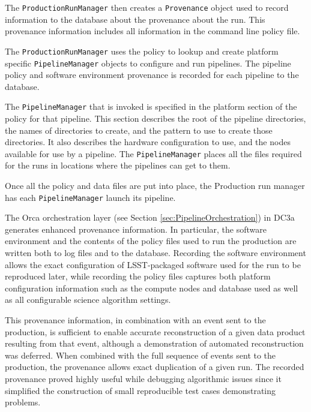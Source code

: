 The \texttt{ProductionRunManager} then creates a \texttt{Provenance} object used
to record information to the database about the provenance about the run. This
provenance information includes all information in the command line policy file.

The \texttt{ProductionRunManager} uses the policy to lookup and create platform
specific \texttt{Pipeline\-Manager} objects to configure and run pipelines. The
pipeline policy and software environment provenance is recorded for each
pipeline to the database.

The \texttt{PipelineManager} that is invoked is specified in the platform
section of the policy for that pipeline.  This section describes the root of the
pipeline directories, the names of directories to create, and the pattern to use
to create those directories.  It also describes the hardware configuration to
use, and the nodes available for use by a pipeline. The \texttt{PipelineManager}
places all the files required for the runs in locations where the pipelines can
get to them.

Once all the policy and data files are put into place, the Production run
manager has each \texttt{PipelineManager} launch its pipeline.


The Orca orchestration layer (see Section
\ref{sec:PipelineOrchestration}) in DC3a generates enhanced provenance
information.  In particular, the software environment and the contents
of the policy files used to run the production are written both to log
files and to the database.  Recording the software environment allows
the exact configuration of LSST-packaged software used for the run to be
reproduced later, while recording the policy files captures both
platform configuration information such as the compute nodes and
database used as well as all configurable science algorithm settings.

This provenance information, in combination with an event sent to the
production, is sufficient to enable accurate reconstruction of a given
data product resulting from that event, although a demonstration of
automated reconstruction was deferred.  When combined with the full
sequence of events sent to the production, the provenance allows exact
duplication of a given run.  The recorded provenance proved highly
useful while debugging algorithmic issues since it simplified the
construction of small reproducible test cases demonstrating problems.
\iffalse
\RHL{My impression was that we didn't yet have the ability to 
down the stage configuration associated with an error, or
is this what, ``a demonstration of 
automated reconstruction was deferred''?}
KTL - We can get the configuration easily.  What is not so readily
available is the inputs to a given stage, many of which may not be
pipeline data products (they are just internal).  This is why the text
says "simplified" and not "automatically enabled".  The clipboard inputs
can always be re-created by re-running the pipeline, but this may be
inconvenient and inefficient.
\fi

